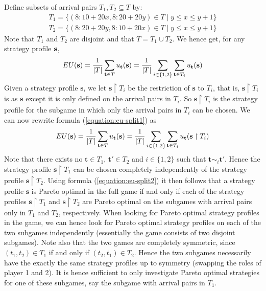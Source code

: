 \documentclass[twocolumn,a4paper,superscriptaddress,nofootinbib]{revtex4}
\begin{document}
Define subsets of arrival pairs $T_1, T_2 \subseteq T$ by:
\[
  \begin{array}{l}
  T_1 = \{ (8{:}10 + 20x, 8{:}20 + 20y) \in T \mid  y \leq x \leq y+1 \} \\
  T_2 = \{ (8{:}20 + 20y, 8{:}10 + 20x) \in T \mid  y \leq x \leq y+1 \}
  \end{array}
\]
Note that $T_1$ and $T_2$ are disjoint and that $T = T_1 \cup T_2$. We hence get, for any strategy profile $\bf s$,
\begin{equation}\label{equation:eu-split1}
 EU({\bf s}) = \frac{1}{| T |} \sum_{{\bf t} \in T} u_\mathbf{t}(\mathbf{s}) = \frac{1}{|T|} \sum_{i \in \{1,2\} } \sum_{{\bf t} \in T_i} u_\mathbf{t}(\mathbf{s})
\end{equation}
Given a strategy profile $\mathbf{s}$, we let $\mathbf{s} \upharpoonright T_i$ be the restriction of $\mathbf{s}$ to $T_i$, that is, $\mathbf{s} \upharpoonright T_i$ is as $\mathbf{s}$ except it is only defined on the arrival pairs in $T_i$. So $\mathbf{s} \upharpoonright T_i$ is the strategy profile for the subgame in which only the arrival pairs in $T_i$ can be chosen. We can now rewrite formula (\ref{equation:eu-split1}) as
\begin{equation}\label{equation:eu-split2}
 EU({\bf s}) = \frac{1}{| T |} \sum_{{\bf t} \in T} u_\mathbf{t}(\mathbf{s}) = \frac{1}{|T|}
\sum_{i \in \{1,2\}}
  \sum_{{\bf t} \in T_i} u_\mathbf{t}(\mathbf{s}  \upharpoonright T_i)
\end{equation}
Note that there exists no $\mathbf{t} \in T_1$, $\mathbf{t}' \in T_2$ and $i\in \{1,2\}$ such that $\mathbf{t} \sim_i \mathbf{t'}$. Hence the strategy profile $\mathbf{s} \upharpoonright T_1$ can be chosen completely independently of the strategy profile $\mathbf{s} \upharpoonright T_2$. Using formula (\ref{equation:eu-split2}) it then follows that a strategy profile $\mathbf{s}$ is Pareto optimal in the full game if and only if each of the strategy profiles $\mathbf{s} \upharpoonright T_1$ and $\mathbf{s} \upharpoonright T_2$ are Pareto optimal on the subgames with arrival pairs only in $T_1$ and $T_2$, respectively. When looking for Pareto optimal strategy profiles in the game, we can hence look for Pareto optimal strategy profiles on each of the two subgames independently (essentially the game consists of two disjoint subgames). Note also that the two games are completely symmetric, since $(t_1,t_2) \in T_1$ if and only if $(t_2,t_1) \in T_2$. Hence the two subgames necessarily have the exactly the same strategy profiles up to symmetry (swapping the roles of player 1 and 2). It is hence sufficient to only investigate Pareto optimal strategies for one of these subgames, say the subgame with arrival pairs in $T_1$.
\end{document}
